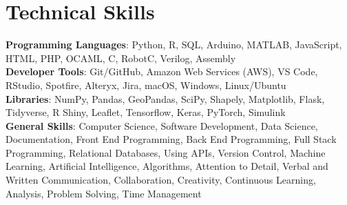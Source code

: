 \documentclass[a4paper,10pt]{article}
\begin{document}
\section{Technical Skills}
 \begin{itemize}[leftmargin=0.15in, label={}]
    \small{\item{
     \textbf{Programming Languages}{: Python, R, SQL, Arduino, MATLAB, JavaScript, HTML, PHP, OCAML, C, RobotC, Verilog, Assembly} \\
     \textbf{Developer Tools}{: Git/GitHub, Amazon Web Services (AWS), VS Code, RStudio, Spotfire, Alteryx, Jira, macOS, Windows, Linux/Ubuntu} \\
     \textbf{Libraries}{: NumPy, Pandas, GeoPandas, SciPy, Shapely, Matplotlib, Flask, Tidyverse, R Shiny, Leaflet, Tensorflow, Keras, PyTorch, Simulink} \\
     \textbf{General Skills}{: Computer Science, Software Development, Data Science, Documentation, Front End Programming, Back End Programming, Full Stack Programming, Relational Databases, Using APIs, Version Control, Machine Learning, Artificial Intelligence, Algorithms, Attention to Detail, Verbal and Written Communication, Collaboration, Creativity, Continuous Learning, Analysis, Problem Solving, Time Management
    }}}
 \end{itemize}


\end{document}
